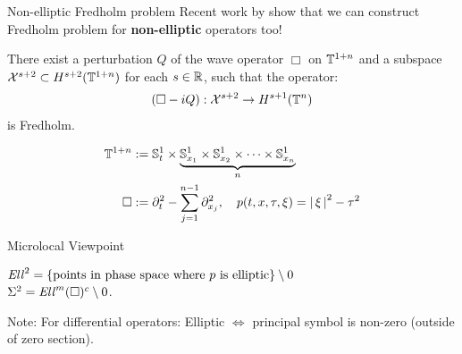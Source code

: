 \documentclass{beamer}
\begin{document}
\begin{frame}{Non-elliptic Fredholm problem}
Recent work by \cite{Vasy, Gell-Redman} show that we can construct Fredholm problem for \textbf{non-elliptic} operators too! \\
\begin{theorem} 
    There exist a perturbation $Q$ of the wave operator $\Box$ on ${\mathbb T}^{1 + n}$ and a subspace $\mathcal{X}^{s + 2} \subset H^{s+ 2}({\mathbb T}^{1 +n})$ for each $s \in {\ensuremath {\mathbb R}}$, such that the operator: 
    \begin{align*}
    (\Box - iQ): \mathcal{X}^{s + 2} \to H^{s + 1}({\mathbb T}^n)
    \end{align*}
    is Fredholm. 
\end{theorem}
\begin{align*}
{\ensuremath {\mathbb T}}^{1 + n} &:= \mathbb S^1_t \times  \underbrace{\mathbb S^1_{x_1} \times \mathbb S^1_{x_2} \times \dots \times \mathbb S^1_{x_n}}_{n} \\
\Box &:= \partial_t^2 - \sum_{j = 1}^{n -1} \partial_{x_j}^2, \quad p(t, x, \tau, \xi) = \left|\, \xi\,\right|^2 - \tau^2
\end{align*}
\end{frame} 

\begin{frame}{Microlocal Viewpoint}
\begin{center}
\end{center}
$\mathit{Ell}^2=  \left\{\text{points in phase space where $p$ is elliptic}\right\} \setminus 0 $ \\
$\Sigma^2 = \mathit{Ell}^m(\Box)^c \setminus 0$. 

Note: For differential operators: Elliptic $\iff$  principal symbol is non-zero (outside of zero section). 
\end{frame} 
\end{document}
